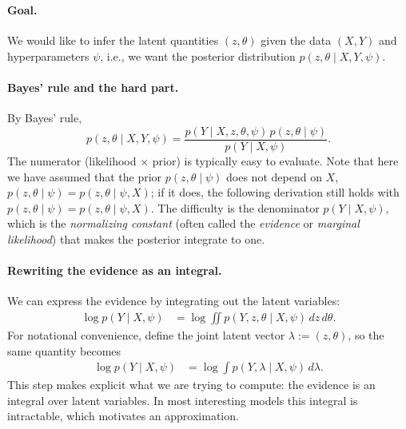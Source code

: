 \section{}

\paragraph{Goal.}
We would like to infer the latent quantities $(z,\theta)$ given the data $(X,Y)$ and hyperparameters $\psi$,
i.e., we want the posterior distribution $p(z,\theta\mid X,Y,\psi)$.

\paragraph{Bayes' rule and the hard part.}
By Bayes' rule,
\begin{equation}\label{eq:posterior_bayes}
p(z,\theta \mid X,Y,\psi)
=\frac{p(Y \mid X,z,\theta,\psi)\,p(z,\theta \mid \psi)}{p(Y \mid X,\psi)}.
\end{equation}
The numerator (likelihood $\times$ prior) is typically easy to evaluate. Note that here we have assumed
that the prior $p(z,\theta\mid \psi)$ does not depend on $X$, $p(z,\theta\mid \psi) = p(z,\theta\mid \psi, X)$; if it does, the following derivation still holds with $p(z,\theta\mid \psi) = p(z,\theta\mid \psi, X)$.
The difficulty is the denominator $p(Y\mid X,\psi)$, which is the \emph{normalizing constant}
(often called the \emph{evidence} or \emph{marginal likelihood}) that makes the posterior integrate to one.

\paragraph{Rewriting the evidence as an integral.}
We can express the evidence by integrating out the latent variables:
\begin{align}
\log p(Y \mid X,\psi)
&= \log \iint p(Y,z,\theta \mid X,\psi)\,dz\,d\theta. \label{eq:evidence_integral}
\end{align}
For notational convenience, define the joint latent vector $\lambda := (z,\theta)$, so the same quantity becomes
\begin{align}
\log p(Y \mid X,\psi)
&= \log \int p(Y,\lambda \mid X,\psi)\,d\lambda. \label{eq:evidence_lambda}
\end{align}
This step makes explicit what we are trying to compute: the evidence is an integral over latent variables.
In most interesting models this integral is intractable, which motivates an approximation.

